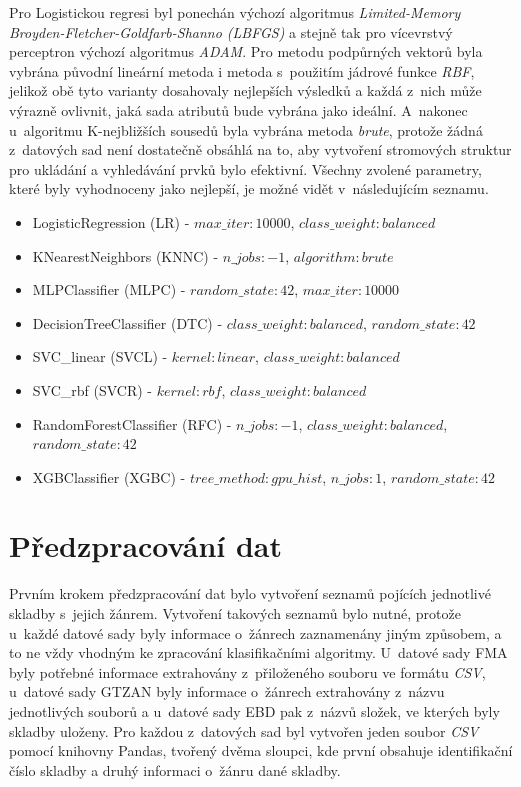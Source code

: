 Pro Logistickou regresi byl ponechán výchozí algoritmus \textit{Limited-Memory Broyden-Fletcher-Goldfarb-Shanno (LBFGS)} a stejně tak pro vícevrstvý perceptron výchozí algoritmus \textit{ADAM}. Pro metodu podpůrných vektorů byla vybrána původní lineární metoda i metoda s~použitím jádrové funkce \textit{RBF}, jelikož obě tyto varianty dosahovaly nejlepších výsledků a každá z~nich může výrazně ovlivnit, jaká sada atributů bude vybrána jako ideální. A~nakonec u~algoritmu K-nejbližších sousedů byla vybrána metoda \textit{brute}, protože žádná z~datových sad není dostatečně obsáhlá na to, aby vytvoření stromových struktur pro ukládání a vyhledávání prvků bylo efektivní. Všechny zvolené parametry, které byly vyhodnoceny jako nejlepší, je možné vidět v~následujícím seznamu.

\begin{itemize}
    \item LogisticRegression (LR) - $max\_iter:10000$, $class\_weight:balanced$
    \item KNearestNeighbors (KNNC) - $n\_jobs:-1$, $algorithm:brute$
    \item MLPClassifier (MLPC) - $random\_state:42$, $max\_iter:10000$
    \item DecisionTreeClassifier (DTC) - $class\_weight:balanced$, $random\_state:42$
    \item SVC\_linear (SVCL) - $kernel:linear$, $class\_weight:balanced$
    \item SVC\_rbf (SVCR) - $kernel:rbf$, $class\_weight:balanced$
    \item RandomForestClassifier (RFC) - $n\_jobs:-1$, $class\_weight:balanced$,
    \newline $random\_state:42$
    \item XGBClassifier (XGBC) - $tree\_method:gpu\_hist$, $n\_jobs:1$, $random\_state:42$
\end{itemize}

\section{Předzpracování dat}
\label{NIS_predzpracovani_dat_a_vyber_klasifikacnich_algoritmu}
Prvním krokem předzpracování dat bylo vytvoření seznamů pojících jednotlivé skladby s~jejich žánrem. Vytvoření takových seznamů bylo nutné, protože u~každé datové sady byly informace o~žánrech zaznamenány jiným způsobem, a to ne vždy vhodným ke zpracování klasifikačními algoritmy. U~datové sady FMA byly potřebné informace extrahovány z~přiloženého souboru ve formátu \textit{CSV}, u~datové sady GTZAN byly informace o~žánrech extrahovány z~názvu jednotlivých souborů a u~datové sady EBD pak z~názvů složek, ve kterých byly skladby uloženy. Pro každou z~datových sad byl vytvořen jeden soubor \textit{CSV} pomocí knihovny Pandas, tvořený dvěma sloupci, kde první obsahuje identifikační číslo skladby a druhý informaci o~žánru dané skladby.

